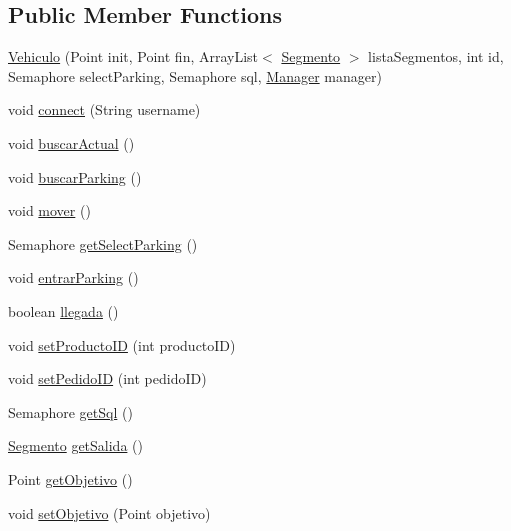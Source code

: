 \subsection*{Public Member Functions}
\begin{DoxyCompactItemize}
\item 
\mbox{\hyperlink{classsimulator_1_1_vehiculo_a1614333acce021409a3bfe74a88750d4}{Vehiculo}} (Point init, Point fin, Array\+List$<$ \mbox{\hyperlink{classsimulator_1_1_segmento}{Segmento}} $>$ lista\+Segmentos, int id, Semaphore select\+Parking, Semaphore sql, \mbox{\hyperlink{classsimulator_1_1_manager}{Manager}} manager)
\item 
void \mbox{\hyperlink{classsimulator_1_1_vehiculo_a7dc301ce9a868990dea8e406dd038979}{connect}} (String username)
\item 
void \mbox{\hyperlink{classsimulator_1_1_vehiculo_aca90600bc94ce6dd02ddd4e5b712e687}{buscar\+Actual}} ()
\item 
void \mbox{\hyperlink{classsimulator_1_1_vehiculo_aa59295cc134f0db04e5b822ec7d6d147}{buscar\+Parking}} ()
\item 
void \mbox{\hyperlink{classsimulator_1_1_vehiculo_a6180368ea8c35b2e7113a5f2b1368f92}{mover}} ()
\item 
Semaphore \mbox{\hyperlink{classsimulator_1_1_vehiculo_afff145cddc29699082dab8c05d18137d}{get\+Select\+Parking}} ()
\item 
void \mbox{\hyperlink{classsimulator_1_1_vehiculo_aa860fe7afa2700e63751b39296a3dbe2}{entrar\+Parking}} ()
\item 
boolean \mbox{\hyperlink{classsimulator_1_1_vehiculo_a7206f5327c1bb0c7e5ce49d526542740}{llegada}} ()
\item 
void \mbox{\hyperlink{classsimulator_1_1_vehiculo_aa917981d13bea186e4016a9a367c8288}{set\+Producto\+ID}} (int producto\+ID)
\item 
void \mbox{\hyperlink{classsimulator_1_1_vehiculo_ac84b60f19a1fcfa901dc0be573edf80f}{set\+Pedido\+ID}} (int pedido\+ID)
\item 
Semaphore \mbox{\hyperlink{classsimulator_1_1_vehiculo_a5dfc609221e17e725449964f7482b109}{get\+Sql}} ()
\item 
\mbox{\hyperlink{classsimulator_1_1_segmento}{Segmento}} \mbox{\hyperlink{classsimulator_1_1_vehiculo_ad3da0b0e11fbf762c9efbc02af14791a}{get\+Salida}} ()
\item 
Point \mbox{\hyperlink{classsimulator_1_1_vehiculo_a12c1abc60bddb033fdd3e04f14bb8314}{get\+Objetivo}} ()
\item 
void \mbox{\hyperlink{classsimulator_1_1_vehiculo_a1eb291b75826b406fc1eee91a92b9653}{set\+Objetivo}} (Point objetivo)

\end{DoxyCompactItemize}
